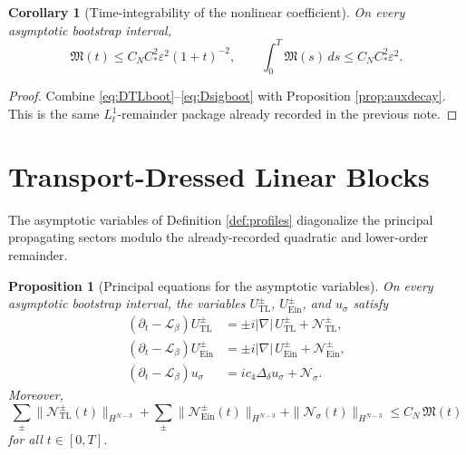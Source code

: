\documentclass[11pt]{article}
\newcommand{\Ell}{\mathcal{L}}
\newtheorem{proposition}{Proposition}
\newtheorem{corollary}{Corollary}
\begin{document}
\begin{corollary}[Time-integrability of the nonlinear coefficient]
\label{cor:Mint}
On every asymptotic bootstrap interval,
\begin{equation}
\mathfrak M(t)\le C_NC_\ast^2\varepsilon^2(1+t)^{-2},
\qquad
\int_0^T \mathfrak M(s)\,ds \le C_NC_\ast^2\varepsilon^2.
\label{eq:Mint}
\end{equation}
\end{corollary}

\begin{proof}
Combine \eqref{eq:DTLboot}--\eqref{eq:Dsigboot} with Proposition \ref{prop:auxdecay}. This is the same \(L_t^1\)-remainder package already recorded in the previous note.
\end{proof}

\section{Transport-Dressed Linear Blocks}

The asymptotic variables of Definition \ref{def:profiles} diagonalize the principal propagating sectors modulo the already-recorded quadratic and lower-order remainder.

\begin{proposition}[Principal equations for the asymptotic variables]
\label{prop:principal}
On every asymptotic bootstrap interval, the variables \(U_{\mathrm{TL}}^\pm\), \(U_{\mathrm{Ein}}^\pm\), and \(u_\sigma\) satisfy
\begin{align}
(\partial_t-\Ell_\beta)U_{\mathrm{TL}}^\pm
&=
\pm i|\nabla|\,U_{\mathrm{TL}}^\pm
+ \mathcal N_{\mathrm{TL}}^\pm,
\label{eq:UTLeq}
\\
(\partial_t-\Ell_\beta)U_{\mathrm{Ein}}^\pm
&=
\pm i|\nabla|\,U_{\mathrm{Ein}}^\pm
+ \mathcal N_{\mathrm{Ein}}^\pm,
\label{eq:UEineq}
\\
(\partial_t-\Ell_\beta)u_\sigma
&=
i c_4\Delta_\delta u_\sigma
+ \mathcal N_\sigma.
\label{eq:usigmaeq}
\end{align}
Moreover,
\begin{equation}
\sum_{\pm}\|\mathcal N_{\mathrm{TL}}^\pm(t)\|_{H^{N-3}}
+ \sum_{\pm}\|\mathcal N_{\mathrm{Ein}}^\pm(t)\|_{H^{N-3}}
+ \|\mathcal N_\sigma(t)\|_{H^{N-3}}
\le
C_N\,\mathfrak M(t)
\label{eq:Nbound}
\end{equation}
for all \(t\in[0,T]\).
\end{proposition}
\end{document}
